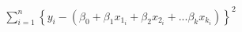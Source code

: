 \documentclass[10pt]{article}
\begin{document}
\begin{align*}\sum_{i=1}^n \left \{y_i - (\beta_0 + \beta_1x_{1_i} + \beta_2x_{2_i} + ... \beta_kx_{k_i}) \right \}
^2\end{align*}
\end{document}
